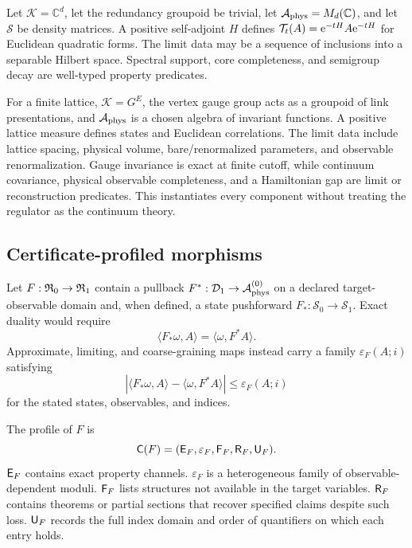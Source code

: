 \begin{example}
Let $\mathcal K=\mathbb C^{d}$, let the redundancy groupoid be trivial, let
$\mathcal A_{\mathrm{phys}}=M_d(\mathbb C)$, and let $\mathcal S$ be density matrices.  A positive
self-adjoint $H$ defines $\mathcal T_t(A)=\mathrm e^{-tH}A\mathrm e^{-tH}$ for Euclidean
quadratic forms.  The limit data may be a sequence of inclusions into a
separable Hilbert space.  Spectral support, core completeness, and semigroup
decay are well-typed property predicates.
\end{example}

\begin{example}
For a finite lattice, $\mathcal K=G^{E}$, the vertex gauge group acts as a
groupoid of link presentations, and $\mathcal A_{\mathrm{phys}}$ is a chosen algebra of invariant
functions.  A positive lattice measure defines states and Euclidean
correlations.  The limit data include lattice spacing, physical volume,
bare/renormalized parameters, and observable renormalization.  Gauge
invariance is exact at finite cutoff, while continuum covariance, physical
observable completeness, and a Hamiltonian gap are limit or reconstruction
predicates.  This instantiates every component without treating the regulator
as the continuum theory.
\end{example}

\subsection{Certificate-profiled morphisms}

Let $F:\mathfrak R_0\to\mathfrak R_1$ contain a pullback
$F^*: \mathcal D_1\to\mathcal A_{\mathrm{phys}}^{(0)}$ on a declared target-observable domain and,
when defined, a state pushforward $F_*:\mathcal S_0\to\mathcal S_1$.  Exact
duality would require
\[
 \langle F_*\omega,A\rangle
   =\langle\omega,F^*A\rangle.
\]
Approximate, limiting, and coarse-graining maps instead carry a family
$\varepsilon_F(A;i)$ satisfying
\begin{equation}
\label{eq:fidelity}
 \left|\langle F_*\omega,A\rangle-
        \langle\omega,F^*A\rangle\right|
 \leq \varepsilon_F(A;i)
\end{equation}
for the stated states, observables, and indices.

\begin{definition}
\label{def:profile}
The profile of $F$ is
\[
 \mathsf C(F)=(\mathsf E_F,\varepsilon_F,\mathsf F_F,\mathsf R_F,\mathsf U_F).
\]
$\mathsf E_F$ contains exact property channels.  $\varepsilon_F$ is a
heterogeneous family of observable-dependent moduli.  $\mathsf F_F$ lists
structures not available in the target variables.  $\mathsf R_F$ contains
theorems or partial sections that recover specified claims despite such loss.
$\mathsf U_F$ records the full index domain and order of quantifiers on which
each entry holds.
\end{definition}

